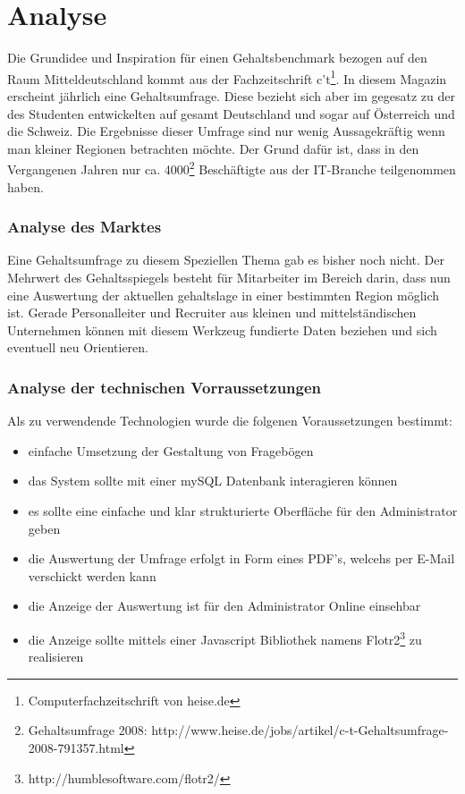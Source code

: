 \part{Analyse}
Die Grundidee und Inspiration für einen Gehaltsbenchmark bezogen auf den Raum Mitteldeutschland kommt aus der Fachzeitschrift c't\footnote{Computerfachzeitschrift von heise.de}. 
In diesem Magazin erscheint jährlich eine Gehaltsumfrage. Diese bezieht sich aber im gegesatz zu der des Studenten entwickelten auf gesamt Deutschland und sogar auf Österreich und die Schweiz.
Die Ergebnisse dieser Umfrage sind nur wenig Aussagekräftig wenn man kleiner Regionen betrachten möchte. 
Der Grund dafür ist, dass in den Vergangenen Jahren nur ca. 4000\footnote{Gehaltsumfrage 2008: http://www.heise.de/jobs/artikel/c-t-Gehaltsumfrage-2008-791357.html} Beschäftigte aus der IT-Branche teilgenommen haben.
\section{Analyse des Marktes}
Eine Gehaltsumfrage zu diesem Speziellen Thema gab es bisher noch nicht. 
Der Mehrwert des Gehaltsspiegels besteht für Mitarbeiter im Bereich  darin, 
dass nun eine Auswertung der aktuellen gehaltslage in einer bestimmten Region möglich ist. 
Gerade Personalleiter und Recruiter aus kleinen und mittelständischen Unternehmen können mit diesem Werkzeug fundierte Daten beziehen und sich eventuell neu Orientieren. 
\section{Analyse der technischen Vorraussetzungen}
Als zu verwendende Technologien wurde die folgenen Voraussetzungen bestimmt:
\begin{itemize}
 \item einfache Umsetzung der Gestaltung von Fragebögen
 \item das System sollte mit einer mySQL Datenbank interagieren können
 \item es sollte eine einfache und klar strukturierte Oberfläche für den Administrator geben
 \item die Auswertung der Umfrage erfolgt in Form eines PDF's, welcehs per E-Mail verschickt werden kann
 \item die Anzeige der Auswertung ist für den Administrator Online einsehbar
 \item die Anzeige sollte mittels einer Javascript Bibliothek namens Flotr2\footnote{http://humblesoftware.com/flotr2/} zu realisieren
\end{itemize}
